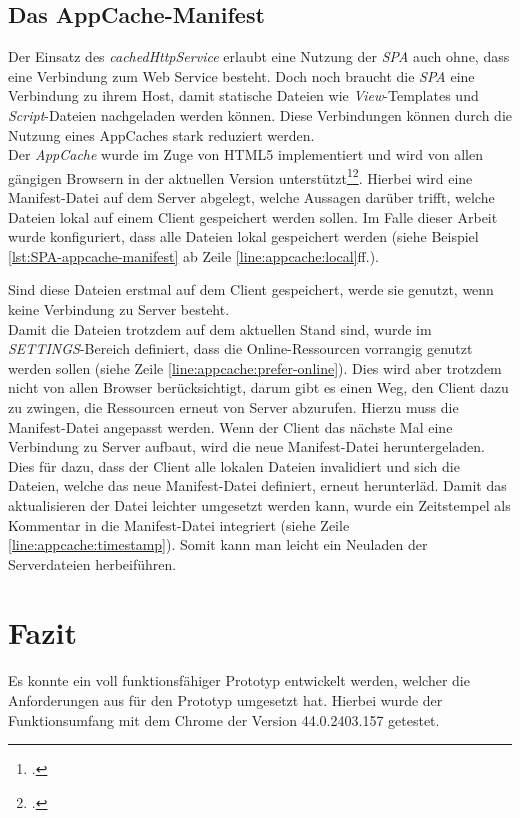 \subsection{Das AppCache-Manifest}
\label{ssec:appcache-manifest}
Der Einsatz des \textit{cachedHttpService} erlaubt eine Nutzung der \textit{SPA} auch ohne, dass eine Verbindung zum Web Service besteht. Doch noch braucht die \textit{SPA} eine Verbindung zu ihrem Host, damit statische Dateien wie \textit{View}-Templates und \textit{Script}-Dateien nachgeladen werden können. Diese Verbindungen können durch die Nutzung eines AppCaches stark reduziert werden. \\
Der \textit{AppCache} wurde im Zuge von \ac{HTML5} implementiert und wird von allen gängigen Browsern in der aktuellen Version unterstützt\footcite{online:AngularJs:indexedDB:w3c}\footcite{online:caniuse:appcache}. Hierbei wird eine Manifest-Datei auf dem Server abgelegt, welche Aussagen darüber trifft, welche Dateien lokal auf einem Client gespeichert werden sollen. Im Falle dieser Arbeit wurde konfiguriert, dass alle Dateien lokal gespeichert werden (siehe Beispiel \ref{lst:SPA-appcache-manifest} ab Zeile \ref{line:appcache:local}ff.). 



Sind diese Dateien erstmal auf dem Client gespeichert, werde sie genutzt, wenn keine Verbindung zu Server besteht. \\
Damit die Dateien trotzdem auf dem aktuellen Stand sind, wurde im \textit{SETTINGS}-Bereich definiert, dass die Online-Ressourcen vorrangig genutzt werden sollen (siehe Zeile \ref{line:appcache:prefer-online}). Dies wird aber trotzdem nicht von allen Browser berücksichtigt, darum gibt es einen Weg, den Client dazu zu zwingen, die Ressourcen erneut von Server abzurufen. Hierzu muss die Manifest-Datei angepasst werden. Wenn der Client das nächste Mal eine Verbindung zu Server aufbaut, wird die neue Manifest-Datei heruntergeladen. Dies für dazu, dass der Client alle lokalen Dateien invalidiert und sich die Dateien, welche das neue Manifest-Datei definiert, erneut herunterläd. Damit das aktualisieren der Datei leichter umgesetzt werden kann, wurde ein Zeitstempel als Kommentar in die Manifest-Datei integriert (siehe Zeile \ref{line:appcache:timestamp}). Somit kann man leicht ein Neuladen der Serverdateien herbeiführen. 
\section{Fazit}
Es konnte ein voll funktionsfähiger Prototyp entwickelt werden, welcher die Anforderungen aus für den Prototyp umgesetzt hat. Hierbei wurde der Funktionsumfang mit dem Chrome der Version 44.0.2403.157 getestet.

